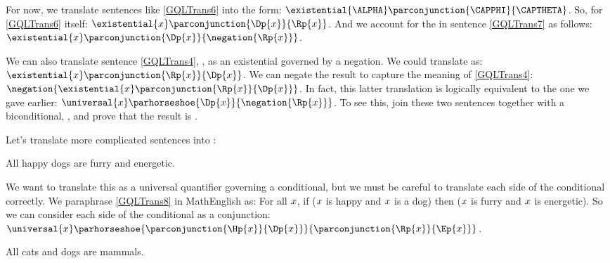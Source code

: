 For now, we translate sentences like \ref{GQLTrans6} into the form: $\existential{\ALPHA}\parconjunction{\CAPPHI}{\CAPTHETA}$.
So, for \ref{GQLTrans6} itself: $\existential{\variable{x}}\parconjunction{\Dp{\variable{x}}}{\Rp{\variable{x}}}$.
And we account for the  in sentence \ref{GQLTrans7} as follows: $\existential{\variable{x}}\parconjunction{\Dp{\variable{x}}}{\negation{\Rp{\variable{x}}}}$.

We can also translate sentence \ref{GQLTrans4}, , as an existential governed by a negation.
We could translate  as: $\existential{\variable{x}}\parconjunction{\Rp{\variable{x}}}{\Dp{\variable{x}}}$.
We can negate the result to capture the meaning of \ref{GQLTrans4}: $\negation{\existential{\variable{x}}\parconjunction{\Rp{\variable{x}}}{\Dp{\variable{x}}}}$.
In fact, this latter translation is logically equivalent to the one we gave earlier: $\universal{\variable{x}}\parhorseshoe{\Dp{\variable{x}}}{\negation{\Rp{\variable{x}}}}$.
To see this, join these two sentences together with a biconditional, \mention{$\TRIPLEBAR$}, and prove that the result is .

Let's translate more complicated sentences into \GQL{}:

\begin{menumerate}
	\item\label{GQLTrans8} All happy dogs are furry and energetic.
\end{menumerate}

\noindent{}We want to translate this as a universal quantifier governing a conditional, but we must be careful to translate each side of the conditional correctly.
We paraphrase \ref{GQLTrans8} in MathEnglish as: For all $x$, if ($x$ is happy and $x$ is a dog) then ($x$ is furry and $x$ is energetic).
So we can consider each side of the conditional as a conjunction: $\universal{\variable{x}}\parhorseshoe{\parconjunction{\Hp{\variable{x}}}{\Dp{\variable{x}}}}{\parconjunction{\Rp{\variable{x}}}{\Ep{\variable{x}}}}$.

\begin{menumerate}
	\item\label{GQLTrans9} All cats and dogs are mammals.
\end{menumerate}

